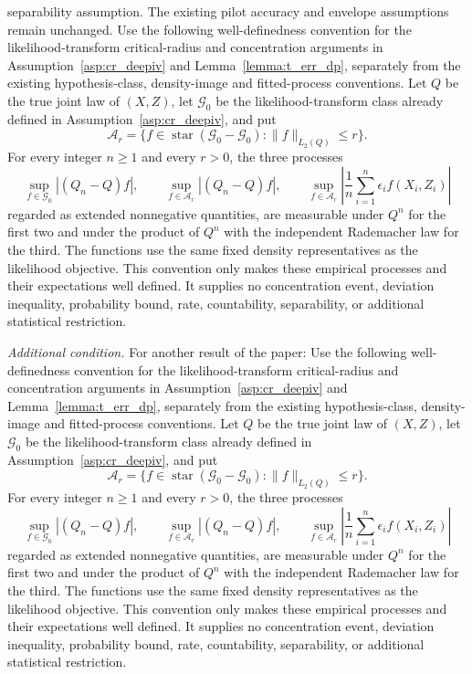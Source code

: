 \begin{lemma}
separability assumption. The existing pilot accuracy and envelope assumptions remain unchanged. Use the following well-definedness convention for the likelihood-transform critical-radius and concentration arguments in Assumption~\ref{asp:cr_deepiv} and Lemma~\ref{lemma:t_err_dp}, separately from the existing hypothesis-class, density-image and fitted-process conventions. Let $Q$ be the true joint law of $(X,Z)$, let $\mathcal G_0$ be the likelihood-transform class already defined in Assumption~\ref{asp:cr_deepiv}, and put \[ \mathcal A_r=\{f\in\operatorname{star}(\mathcal G_0-\mathcal G_0):\|f\|_{L_2(Q)}\leqslant r\}. \] For every integer $n\geqslant1$ and every $r>0$, the three processes \[ \sup_{f\in\mathcal G_0}|(Q_n-Q)f|,\qquad \sup_{f\in\mathcal A_r}|(Q_n-Q)f|,\qquad \sup_{f\in\mathcal A_r}\left|\frac1n\sum_{i=1}^n\epsilon_i f(X_i,Z_i)\right| \] regarded as extended nonnegative quantities, are measurable under $Q^n$ for the first two and under the product of $Q^n$ with the independent Rademacher law for the third. The functions use the same fixed density representatives as the likelihood objective. This convention only makes these empirical processes and their expectations well defined. It supplies no concentration event, deviation inequality, probability bound, rate, countability, separability, or additional statistical restriction.
\end{lemma}

\emph{Additional condition.} For another result of the paper: Use the following well-definedness convention for the likelihood-transform critical-radius and concentration arguments in Assumption~\ref{asp:cr_deepiv} and Lemma~\ref{lemma:t_err_dp}, separately from the existing hypothesis-class, density-image and fitted-process conventions. Let $Q$ be the true joint law of $(X,Z)$, let $\mathcal G_0$ be the likelihood-transform class already defined in Assumption~\ref{asp:cr_deepiv}, and put \[ \mathcal A_r=\{f\in\operatorname{star}(\mathcal G_0-\mathcal G_0):\|f\|_{L_2(Q)}\leqslant r\}. \] For every integer $n\geqslant1$ and every $r>0$, the three processes \[ \sup_{f\in\mathcal G_0}|(Q_n-Q)f|,\qquad \sup_{f\in\mathcal A_r}|(Q_n-Q)f|,\qquad \sup_{f\in\mathcal A_r}\left|\frac1n\sum_{i=1}^n\epsilon_i f(X_i,Z_i)\right| \] regarded as extended nonnegative quantities, are measurable under $Q^n$ for the first two and under the product of $Q^n$ with the independent Rademacher law for the third. The functions use the same fixed density representatives as the likelihood objective. This convention only makes these empirical processes and their expectations well defined. It supplies no concentration event, deviation inequality, probability bound, rate, countability, separability, or additional statistical restriction.

